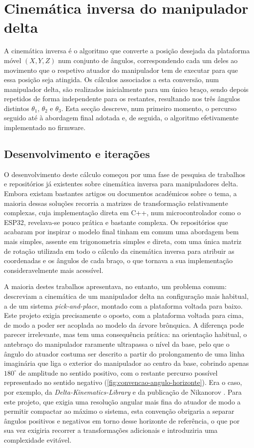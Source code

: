 \clearpage
\section{Cinemática inversa do manipulador delta}\label{sec:cinematica-inversa}
A cinemática inversa é o algoritmo que converte a posição desejada da plataforma móvel \((X,Y,Z)\) num conjunto de ângulos, correspondendo cada um deles ao movimento que o respetivo atuador do manipulador tem de executar para que essa posição seja atingida. Os cálculos associados a esta conversão, num manipulador delta, são realizados inicialmente para um único braço, sendo depois repetidos de forma independente para os restantes, resultando nos três ângulos distintos \(\theta_1\), \(\theta_2\) e \(\theta_3\). Esta secção descreve, num primeiro momento, o percurso seguido até à abordagem final adotada e, de seguida, o algoritmo efetivamente implementado no firmware.

\subsection{Desenvolvimento e iterações}
O desenvolvimento deste cálculo começou por uma fase de pesquisa de trabalhos e repositórios já existentes sobre cinemática inversa para manipuladores delta. Embora existam bastantes artigos ou documentos académicos sobre o tema, a maioria dessas soluções recorria a matrizes de transformação relativamente complexas, cuja implementação direta em C++, num microcontrolador como o ESP32, revelava-se pouco prática e bastante complexa. Os repositórios que acabaram por inspirar o modelo final tinham em comum uma abordagem bem mais simples, assente em trigonometria simples e direta, com uma única matriz de rotação utilizada em todo o cálculo da cinemática inversa para atribuir as coordenadas e os ângulos de cada braço, o que tornava a sua implementação consideravelmente mais acessível.

A maioria destes trabalhos apresentava, no entanto, um problema comum: descreviam a cinemática de um manipulador delta na configuração mais habitual, a de um sistema \textit{pick-and-place}, montado com a plataforma voltada para baixo. Este projeto exigia precisamente o oposto, com a plataforma voltada para cima, de modo a poder ser acoplada ao modelo da árvore brônquica. A diferença pode parecer irrelevante, mas tem uma consequência prática: na orientação habitual, o antebraço do manipulador raramente ultrapassa o nível da base, pelo que o ângulo do atuador costuma ser descrito a partir do prolongamento de uma linha imaginária que liga o exterior do manipulador ao centro da base, cobrindo apenas \(180^\circ\) de amplitude no sentido positivo, com o restante percurso possível representado no sentido negativo (\cref{fig:convencao-angulo-horizonte}). Era o caso, por exemplo, da \textit{Delta-Kinematics-Library} \parencite{TinkersProjects2018} e da publicação de Nikanorov \parencite{Nikanorov_HyperTriangle}. Para este projeto, que exigia uma resolução angular mais fina do atuador de modo a permitir compactar ao máximo o sistema, esta convenção obrigaria a separar ângulos positivos e negativos em torno desse horizonte de referência, o que por sua vez exigiria recorrer a transformações adicionais e introduziria uma complexidade evitável.


